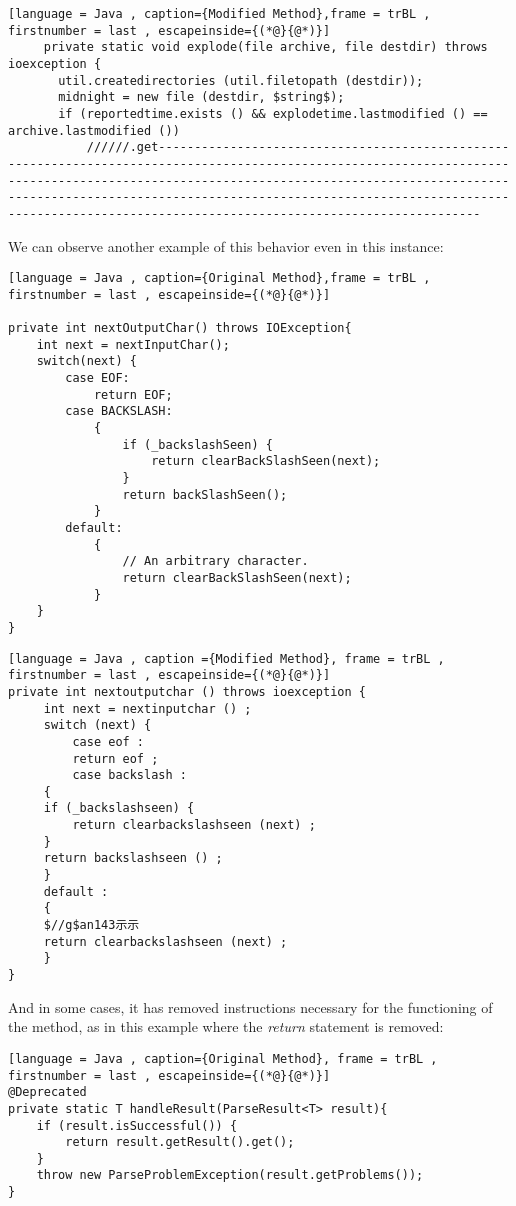 \newpage
\begin{lstlisting}[language = Java , caption={Modified Method},frame = trBL , firstnumber = last , escapeinside={(*@}{@*)}]
	 private static void explode(file archive, file destdir) throws ioexception { 
       util.createdirectories (util.filetopath (destdir)); 
       midnight = new file (destdir, $string$); 
       if (reportedtime.exists () && explodetime.lastmodified () == archive.lastmodified ()) 
           //////.get-------------------------------------------------------------------------------------------------------------------------------------------------------------------------------------------------------------------------------------------------------------------------------------------------------------------------------------
\end{lstlisting}
We can observe another example of this behavior even in this instance:
\begin{lstlisting}[language = Java , caption={Original Method},frame = trBL , firstnumber = last , escapeinside={(*@}{@*)}]

private int nextOutputChar() throws IOException{
    int next = nextInputChar();
    switch(next) {
        case EOF:
            return EOF;
        case BACKSLASH:
            {
                if (_backslashSeen) {
                    return clearBackSlashSeen(next);
                }
                return backSlashSeen();
            }
        default:
            {
                // An arbitrary character.
                return clearBackSlashSeen(next);
            }
    }
}
\end{lstlisting}
\begin{lstlisting}[language = Java , caption ={Modified Method}, frame = trBL , firstnumber = last , escapeinside={(*@}{@*)}]
private int nextoutputchar () throws ioexception { 
     int next = nextinputchar () ; 
     switch (next) { 
         case eof : 
         return eof ; 
         case backslash : 
     { 
     if (_backslashseen) { 
         return clearbackslashseen (next) ; 
     } 
     return backslashseen () ; 
     } 
     default : 
     { 
     $//g$an143示示 
     return clearbackslashseen (next) ; 
     } 
}
\end{lstlisting}
And in some cases, it has removed instructions necessary for the functioning of the method, as in this example where the \textit{return} statement is removed:
\begin{lstlisting}[language = Java , caption={Original Method}, frame = trBL , firstnumber = last , escapeinside={(*@}{@*)}]
@Deprecated
private static T handleResult(ParseResult<T> result){
    if (result.isSuccessful()) {
        return result.getResult().get();
    }
    throw new ParseProblemException(result.getProblems());
}
\end{lstlisting}
